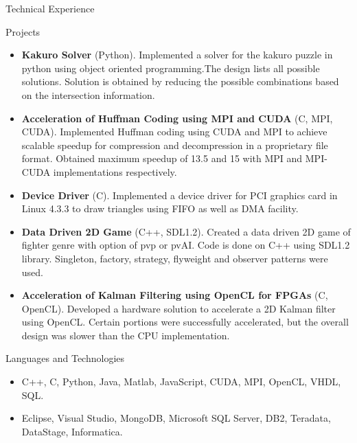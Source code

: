 \documentclass[]{SriramMadhivanan}
\begin{document}
	\begin{cvsection}{Technical Experience}
		\begin{cvsubsection}{Projects}{}{}
			\begin{itemize}
				\item \textbf{Kakuro Solver} (Python). Implemented a solver for the kakuro puzzle in python using object oriented programming.The design lists all possible solutions. Solution is obtained by reducing the possible combinations based on the intersection information.
				\item \textbf{Acceleration of Huffman Coding using MPI and CUDA} (C, MPI, CUDA). Implemented Huffman coding using CUDA and MPI to achieve scalable speedup for compression and decompression in a proprietary file format. Obtained maximum speedup of 13.5 and 15 with MPI and MPI-CUDA implementations respectively. 
				\item \textbf{Device Driver} (C).  Implemented a device driver for PCI graphics card in Linux 4.3.3 to draw triangles using FIFO as well as DMA facility.
				\item \textbf{Data Driven 2D Game} (C++, SDL1.2).  Created a data driven 2D game of fighter genre with option of pvp or pvAI. Code is done on C++ using SDL1.2 library. Singleton, factory, strategy, flyweight and observer patterns were used.
				\item \textbf{Acceleration of Kalman Filtering using OpenCL for FPGAs} (C, OpenCL). Developed a hardware solution to accelerate a 2D Kalman filter using OpenCL. Certain portions were successfully accelerated, but the overall design was slower than the CPU implementation. 
			\end{itemize}
		\end{cvsubsection}
	\end{cvsection}
	
	
	\begin{cvsection}{Languages and Technologies}
		\begin{cvsubsection}{}{}{}	
			\begin{itemize}
				\item C++, C, Python, Java, Matlab, JavaScript, CUDA, MPI, OpenCL, VHDL, SQL.  
				\item  Eclipse, Visual Studio, MongoDB, Microsoft SQL Server, DB2, Teradata, DataStage, Informatica.
			\end{itemize}
		\end{cvsubsection}
	\end{cvsection}
	
\end{document}
